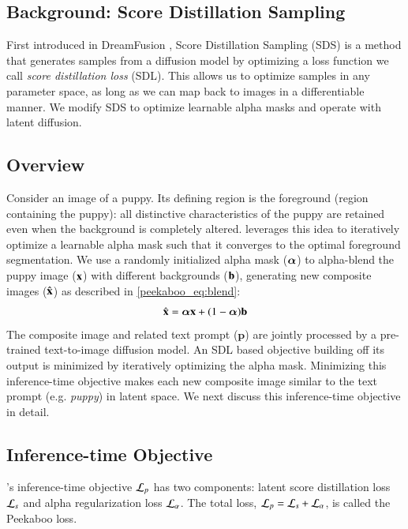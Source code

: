 \subsection{Background: Score Distillation Sampling} 
\label{peekaboo_subsubsec:sds}
First introduced in DreamFusion \cite{Poole2022DreamFusionTU}, Score Distillation Sampling (SDS) is a method that generates samples from a diffusion model by optimizing a loss function we call \textit{score distillation loss} (SDL). This allows us to optimize samples in any parameter space, as long as we can map back to images in a differentiable manner. We modify SDS to optimize learnable alpha masks and operate with latent diffusion.

\subsection{Overview}
\label{peekaboo_subsec:arch}
Consider an image of a puppy. Its defining region is the foreground (region containing the puppy): all distinctive characteristics of the puppy are retained even when the background is completely altered. \modelname leverages this idea to iteratively optimize a learnable alpha mask such that it converges to the optimal foreground segmentation. 
We use a randomly initialized alpha mask ($\boldsymbol{\alpha}$) to alpha-blend the puppy image ($\mathbf{x}$) with different backgrounds ($\mathbf{b}$), generating new composite images ($\hat{\mathbf{x}}$) as described in \cref{peekaboo_eq:blend}:
% 
\begin{equation}
\label{peekaboo_eq:blend}
    \hat{\bx} = \alphamask \bx + (1-\alphamask) \bb
% 
\end{equation}
The composite image and related text prompt ($\mathbf{p}$) are jointly processed by a pre-trained text-to-image diffusion model. An SDL based objective building off its output is minimized by iteratively optimizing the alpha mask. Minimizing this inference-time objective makes each new composite image similar to the text prompt (e.g. \textit{puppy}) in latent space. We next discuss this inference-time objective in detail. 

\subsection{Inference-time Objective}
\label{peekaboo_subsec:loss}
\modelname's inference-time objective $\mathcal{L}_{p}$ has two components: {latent score distillation loss} $\mathcal{L}_{s}$ and {alpha regularization loss} $\mathcal{L}_{\alpha}$. The total loss, $\mathcal{L}_{p}=\mathcal{L}_{s}+\mathcal{L}_{\alpha}$, is called the {Peekaboo loss}.

